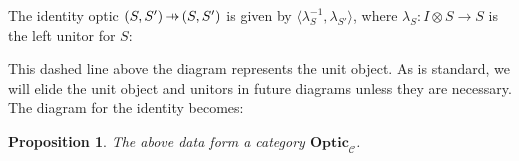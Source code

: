 \documentclass[11pt,a4paper]{article}
\theoremstyle{plain}
\newtheorem{proposition}[theorem]{Proposition}
\theoremstyle{definition}
\newcommand{\C}{\mathscr{C}}
\newcommand{\Optic}{\mathbf{Optic}}
\newcommand{\hto}{\ensuremath{\,\mathaccent\shortmid\rightarrow\,}}
\begin{document}
The identity optic $(S, S') \hto (S, S')$ is given by $\langle \lambda^{-1}_S, \lambda_{S'} \rangle$, where $\lambda_S : I \otimes S \to S$ is the left unitor for $S$: 
\begin{center}

\end{center}
This dashed line above the diagram represents the unit object. As is standard, we will elide the unit object and unitors in future diagrams unless they are necessary. The diagram for the identity becomes:
\begin{center}

\end{center}

\begin{proposition}
The above data form a category $\Optic_\C$.
\end{proposition}
\end{document}
